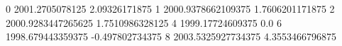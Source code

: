 0 2001.2705078125 2.09326171875
1 2000.9378662109375 1.7606201171875
2 2000.9283447265625 1.7510986328125
4 1999.17724609375 0.0
6 1998.679443359375 -0.497802734375
8 2003.5325927734375 4.3553466796875

